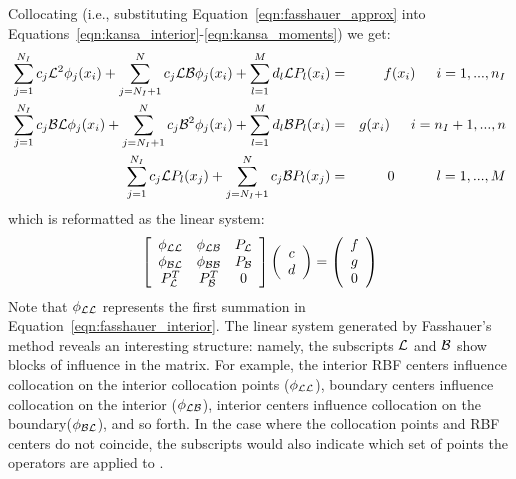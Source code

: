 \documentclass{report}
\begin{document}
{Collocating (i.e., substituting Equation~\ref{eqn:fasshauer_approx} into Equations~\ref{eqn:kansa_interior}-\ref{eqn:kansa_moments}) we get: 
\begin{eqnarray}
\sum_{j=1}^{N_I}c_j\mathcal{L}^2{\phi_j(x_i)} + \sum_{j=N_I+1}^{N}c_j\mathcal{L}\mathcal{B}\phi_j(x_i) + \sum_{l=1}^{M}d_l \mathcal{L}P_l(x_i) &=&f(x_i)  \hskip1.5em i = 1,...,n_I  \label{eqn:fasshauer_interior} \\ 
\sum_{j=1}^{N_I}c_j\mathcal{B}\mathcal{L}\phi_j(x_i) + \sum_{j=N_I+1}^{N}c_j\mathcal{B}^2{\phi_j(x_i)} + \sum_{l=1}^{M}d_l \mathcal{B}P_l(x_i) &=& g(x_i)  \hskip1.5em i = n_I + 1,..., n \label{eqn:fasshauer_boundary} \\
\sum_{j=1}^{N_I} c_j \mathcal{L}P_l(x_j) + \sum_{j=N_I + 1}^{N} c_j \mathcal{B}P_l(x_j) &=& 0 \hskip3.0em l=1,...,M \label{eqn:fasshauer_moments} 
\end{eqnarray}
which is reformatted as the linear system: 
\begin{eqnarray}
\left[ \begin{array}{c c c} 
	\phi_{\mathcal{L}\mathcal{L}} & \phi_{\mathcal{L}\mathcal{B}} & P_{\mathcal{L}} \\
	\phi_{\mathcal{B}\mathcal{L}} & \phi_{\mathcal{B}\mathcal{B}} & P_{\mathcal{B}} \\
	P^T_{\mathcal{L}} & P^T_{\mathcal{B}} & 0 \\
	\end{array} \right] \left( \begin{array}{c}
							{c} \\
							{d}
							 \end{array}
						 \right) = \left( \begin{array}{c}
							{f} \\
							{g} \\
							0
							 \end{array}
						 \right) 
	\label{eqn:fasshauer_method}
\end{eqnarray}
Note that $\phi_{\mathcal{L}\mathcal{L}}$ represents the first summation in Equation~\ref{eqn:fasshauer_interior}. The linear system generated by Fasshauer's method reveals an interesting structure: namely, the subscripts $\mathcal{L}$ and $\mathcal{B}$ show blocks of influence in the matrix. For example, the interior RBF centers influence collocation on the interior collocation points ($\phi_{\mathcal{L}\mathcal{L}}$), boundary centers influence collocation on the interior ($\phi_{\mathcal{L}\mathcal{B}}$), interior centers influence collocation on the boundary($\phi_{\mathcal{B}\mathcal{L}}$), and so forth. In the case where the collocation points and RBF centers do not coincide, the subscripts would also indicate which set of points the operators are applied to \cite{Stevens2009b}. 

}
\end{document}
